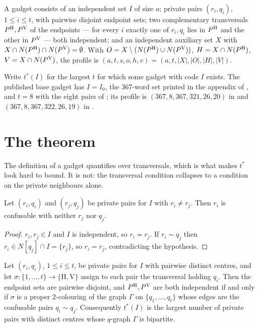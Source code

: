 \begin{definition}
\label{def:gadget}
A gadget consists of an independent set $I$ of size $a$; private pairs $(r_i,q_i)$,
$1\le i\le t$, with pairwise disjoint endpoint sets; two complementary transversals
$P^{\mathrm H},P^{\mathrm V}$ of the endpoints --- for every $i$ exactly one of $r_i,q_i$ lies in $P^{\mathrm H}$ and the
other in $P^{\mathrm V}$ --- both independent; and an independent auxiliary set $X$ with
$X\cap N(P^{\mathrm H})\cap N(P^{\mathrm V})=\emptyset$. With
$O=X\setminus(N(P^{\mathrm H})\cup N(P^{\mathrm V}))$, $H=X\cap N(P^{\mathrm H})$, $V=X\cap N(P^{\mathrm V})$, the profile is
$(a,t,s,o,h,v)=(a,t,|X|,|O|,|H|,|V|)$.
\end{definition}

Write $t^*(I)$ for the largest $t$ for which some gadget with code $I$ exists. The published
base gadget has $I=I_0$, the $367$-word set printed in the appendix of \cite{polak2019},
and $t=8$ with the eight pairs of \cite{itty2026}; its profile is $(367,8,367,321,26,20)$
in \cite{gao2026} and $(367,8,367,322,26,19)$ in \cite{bpz2026,tandon2026}.

\section{The theorem}
\label{sec:theorem}

The definition of a gadget quantifies over transversals, which is what makes $t^*$ look hard
to bound. It is not: the transversal condition collapses to a condition on the private
neighbours alone.

\begin{lemma}[no mixing]
\label{lem:nomix}
Let $(r_i,q_i)$ and $(r_j,q_j)$ be private pairs for $I$ with $r_i\neq r_j$. Then $r_i$ is
confusable with neither $r_j$ nor $q_j$.
\end{lemma}

\begin{proof}
$r_i,r_j\in I$ and $I$ is independent, so $r_i\not\sim r_j$. If $r_i\sim q_j$ then
$r_i\in N[q_j]\cap I=\{r_j\}$, so $r_i=r_j$, contradicting the hypothesis.
\end{proof}

\begin{corollary}
\label{cor:bip}
Let $(r_i,q_i)$, $1\le i\le t$, be private pairs for $I$ with pairwise distinct centres, and
let $\sigma:\{1,\dots,t\}\to\{\mathrm H,\mathrm V\}$ assign to each pair the transversal
holding $q_i$. Then the endpoint sets are pairwise disjoint, and $P^{\mathrm H},P^{\mathrm V}$ are both
independent if and only if $\sigma$ is a proper $2$-colouring of the graph $\Gamma$ on
$\{q_1,\dots,q_t\}$ whose edges are the confusable pairs $q_i\sim q_j$. Consequently
$t^*(I)$ is the largest number of private pairs with distinct centres whose $q$-graph
$\Gamma$ is bipartite.
\end{corollary}

